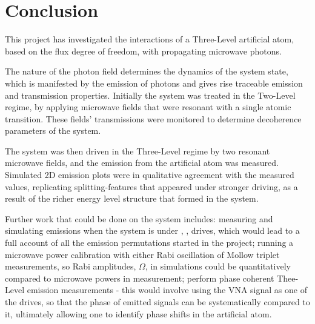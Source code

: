  
\section{Conclusion\label{sec:Conclusion}}
 This project has investigated the interactions of a Three-Level artificial atom, based on the flux degree of freedom, with propagating microwave photons. 
 
 The nature of the photon field determines the dynamics of the system state, which is manifested by the emission of photons and gives rise traceable emission and transmission properties. Initially the system was treated in the Two-Level regime, by applying microwave fields that were resonant with a single atomic transition. These fields' transmissions were monitored to determine decoherence parameters of the system.
 
 The system was then driven in the Three-Level regime by two resonant microwave fields, and the emission from the artificial atom was measured. Simulated 2D emission plots were in qualitative agreement with the measured values, replicating splitting-features that appeared under stronger driving, as a result of the richer energy level structure that formed in the system.
 
 Further work that could be done on the system includes: measuring and simulating \ra{} emissions when the system is under \lra{}, \lra{}, drives, which would lead to a full account of all the emission permutations started in the project; running a microwave power calibration with either Rabi oscillation of Mollow triplet measurements, so Rabi amplitudes, $ \Omega $, in simulations could be quantitatively compared to microwave powers in measurement; perform phase coherent Thee-Level emission measurements - this would involve using the VNA signal as one of the drives, so that the phase of emitted signals can be systematically compared to it, ultimately allowing one to identify phase shifts in the artificial atom. 

